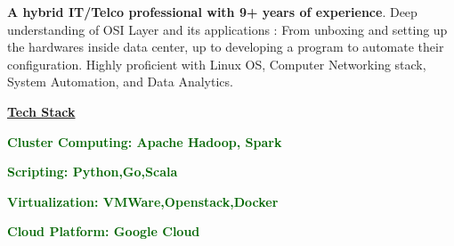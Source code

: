 
\begin{cvparagraph}

\textbf{A hybrid IT/Telco professional with 9+ years of experience}. Deep understanding of OSI Layer and its applications : From unboxing and setting up the hardwares inside data center, up to developing a program to automate their configuration. Highly proficient with Linux OS, Computer Networking stack, System Automation, and Data Analytics.

\underline{\textbf{Tech Stack}} 
\newline
\begin{cvitems}
\item {\textcolor{darkgreen}{\textbf{Cluster Computing: Apache Hadoop, Spark}}} 
\item {\textcolor{darkgreen}{\textbf{Scripting: Python,Go,Scala}}}
\item {\textcolor{darkgreen}{\textbf{Virtualization: VMWare,Openstack,Docker}}}
\item {\textcolor{darkgreen}{\textbf{Cloud Platform: Google Cloud}}}
\end{cvitems}
\end{cvparagraph}

